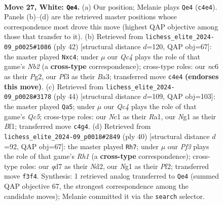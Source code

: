 \documentclass[11pt]{article}
\begin{document}
\clearpage

\begin{figure}[p]\centering
\begin{subfigure}{0.46\textwidth}\centering
\resizebox{\linewidth}{!}{%
\newchessgame
\chessboard[
  setfen={r1b1rk2/3q3p/ppn2P2/2p1p1p1/P1Q5/2P2P2/6PP/1KN1RBNR w - - 0 27},
  showmover=false,
  pgfstyle=straightmove, color=movearrow, markmove={c4-e4}
]}
\caption{}
\end{subfigure}\hfill
\begin{subfigure}{0.46\textwidth}\centering
\resizebox{\linewidth}{!}{%
\newchessgame
\chessboard[
  setfen={r3r1k1/p1b3p1/2p1b2p/4q3/2ppP2P/BP6/PNQ2PP1/4RK1R w - - 0 22},
  showmover=false,
  pgfstyle=straightmove, color=movearrow, markmove={b2-c4}
]}
\caption{}
\end{subfigure}
\\[4pt]
\begin{subfigure}{0.46\textwidth}\centering
\resizebox{\linewidth}{!}{%
\newchessgame
\chessboard[
  setfen={2nrr1k1/pq4bp/2p1bpp1/2Q1p3/4P2P/1PN1BPP1/P7/R3KB1R w KQ - 1 23},
  showmover=false,
  pgfstyle=straightmove, color=movearrow, markmove={c5-a5}
]}
\caption{}
\end{subfigure}\hfill
\begin{subfigure}{0.46\textwidth}\centering
\resizebox{\linewidth}{!}{%
\newchessgame
\chessboard[
  setfen={2r1kbr1/p2n1p2/q3p3/P5p1/1p1P4/3p1QB1/1P1N1PP1/R3K2R w KQ - 0 21},
  showmover=false,
  pgfstyle=straightmove, color=movearrow, markmove={h1-h7}
]}
\caption{}
\end{subfigure}
\caption{\textbf{Move 27, White: \texttt{Qe4}.} (a) Our position; Melanie plays \texttt{Qe4} (\texttt{c4e4}). Panels (b)--(d) are the retrieved master positions whose correspondence most drove this move (highest QAP objective among those that transfer to it). (b) Retrieved from \texttt{lichess\_elite\_2024-09\_p0025\#1086} (ply 42) [structural distance $d$=120, QAP obj=67]: the master played \texttt{Nxc4}; under $\mu$ our \emph{Qc4} plays the role of that game's \emph{Nb2} (a \textbf{cross-type} correspondence); cross-type roles: our \emph{n}c6 as their \emph{P}g2, our \emph{P}f3 as their \emph{B}a3; transferred move \texttt{c4e4} \textbf{(endorses this move)}. (c) Retrieved from \texttt{lichess\_elite\_2024-09\_p0028\#3178} (ply 44) [structural distance $d$=109, QAP obj=103]: the master played \texttt{Qa5}; under $\mu$ our \emph{Qc4} plays the role of that game's \emph{Qc5}; cross-type roles: our \emph{N}c1 as their \emph{R}a1, our \emph{N}g1 as their \emph{B}f1; transferred move \texttt{c4g4}. (d) Retrieved from \texttt{lichess\_elite\_2024-09\_p0018\#2849} (ply 40) [structural distance $d$=92, QAP obj=67]: the master played \texttt{Rh7}; under $\mu$ our \emph{Pf3} plays the role of that game's \emph{Rh1} (a \textbf{cross-type} correspondence); cross-type roles: our \emph{q}d7 as their \emph{N}d2, our \emph{N}g1 as their \emph{P}f2; transferred move \texttt{f3f4}. Synthesis: 1 retrieved analog transferred to \texttt{Qe4} (summed QAP objective 67, the strongest correspondence among the candidate moves); Melanie committed it via the \texttt{search} selector.}
\label{fig:thought-m52}
\end{figure}
\end{document}
